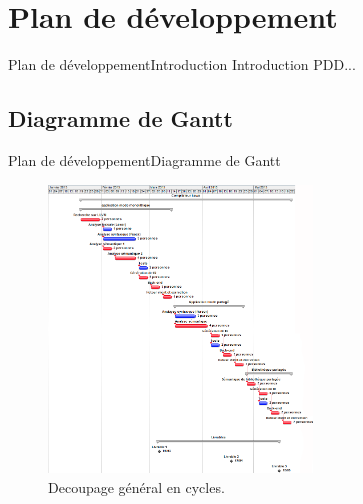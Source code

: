 \section{Plan de développement}
    \begin{frame}{Plan de développement}{Introduction}
      Introduction PDD...
    \end{frame}
  \subsection{Diagramme de Gantt}
    \begin{frame}{Plan de développement}{Diagramme de Gantt}
      \begin{figure}[!h]
          \includegraphics[width=7cm]{../pdd/fig/decoupage_cycles.png}
          \caption{Decoupage général en cycles.}
          \label{decoupage_cycles}
        \end{figure}
    \end{frame}
